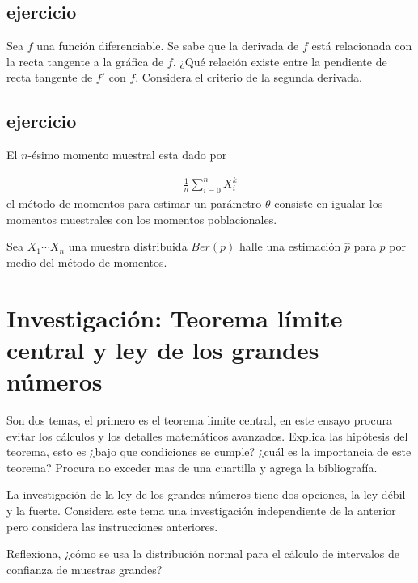 \documentclass{assignment}
\begin{document}
\subsection{ejercicio}
Sea $f$ una función diferenciable. Se sabe que la derivada de $f$ está relacionada con la recta tangente  a la gráfica de $f.$ ¿Qué relación existe entre la pendiente de recta tangente de $f'$ con $f$. Considera el criterio de la segunda derivada.
\subsection{ejercicio}
El $n$-ésimo momento muestral esta dado por 

\begin{align*}
\frac{1}{n} \sum_ {i=0}^n X_i^k
\end{align*}
el método  de momentos para estimar un parámetro $\theta$ consiste en igualar los momentos muestrales con los momentos poblacionales. 

Sea $X_1 \cdots X_n$ una muestra distribuida $Ber(p)$ halle una estimación $\hat{p}$ para $p$ por medio del método de momentos. 


\section{Investigación: Teorema límite central y ley de los grandes números}

Son dos temas, el primero es el teorema limite central, en este ensayo procura evitar los cálculos y los detalles matemáticos avanzados. Explica las hipótesis del teorema, esto es ¿bajo que condiciones se cumple? ¿cuál es la importancia de este teorema? Procura no exceder mas de una cuartilla y agrega la bibliografía. 

La investigación de la ley de los grandes números tiene dos opciones, la ley débil y la fuerte. Considera este tema una investigación independiente de la anterior pero considera las instrucciones anteriores. 

Reflexiona, ¿cómo se usa la distribución normal para el cálculo de intervalos de confianza de muestras grandes? 
\end{document}
